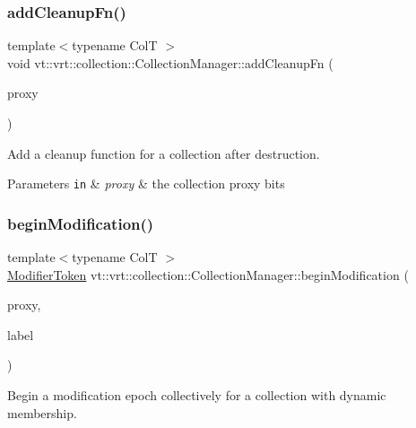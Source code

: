 \subsubsection{\texorpdfstring{add\+Cleanup\+Fn()}{addCleanupFn()}}
{\footnotesize\ttfamily template$<$typename ColT $>$ \\
void vt\+::vrt\+::collection\+::\+Collection\+Manager\+::add\+Cleanup\+Fn (\begin{DoxyParamCaption}\item[{\hyperlink{namespacevt_a1b417dd5d684f045bb58a0ede70045ac}{Virtual\+Proxy\+Type}}]{proxy }\end{DoxyParamCaption})}



Add a cleanup function for a collection after destruction. 


\begin{DoxyParams}[1]{Parameters}
\mbox{\tt in}  & {\em proxy} & the collection proxy bits \\
\hline
\end{DoxyParams}
\mbox{\label{structvt_1_1vrt_1_1collection_1_1_collection_manager_ac390149ecceb5a5b183086e509c3bfaa}} 
\subsubsection{\texorpdfstring{begin\+Modification()}{beginModification()}}
{\footnotesize\ttfamily template$<$typename ColT $>$ \\
\hyperlink{structvt_1_1vrt_1_1collection_1_1_modifier_token}{Modifier\+Token} vt\+::vrt\+::collection\+::\+Collection\+Manager\+::begin\+Modification (\begin{DoxyParamCaption}\item[{\hyperlink{structvt_1_1vrt_1_1collection_1_1_collection_manager_a56458ed7f9bb22b631b9b3a745f42f94}{Collection\+Proxy\+Wrap\+Type}$<$ ColT $>$ const \&}]{proxy,  }\item[{std\+::string const \&}]{label }\end{DoxyParamCaption})}



Begin a modification epoch collectively for a collection with dynamic membership. 


